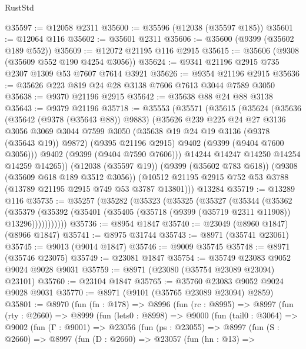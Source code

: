 \begin{lexlean}{RustStd}
\begin{coremodule}
@35597 := @12058 @2311
@35600 := @35596 (@12038 (@35597 @185))
@35601 := @12064 @116
@35602 := @35601 @2311
@35606 := @35600 (@9399 (@35602 @189 @552))
@35609 := @12072 @21195 @116 @2915
@35615 := @35606 (@9308 (@35609 @552 @190 @4254 @3056))
@35624 := @9341 @21196 @2915 @735 @2307 @1309 @53 @7607 @7614 @3921
@35626 := @9354 @21196 @2915
@35636 := @35626 @223 @819 @24 @28 @3138 @7606 @7613 @3044 @7589 @3050
@35638 := @9370 @21196 @2915
@35642 := @35638 @88 @24 @88 @3138
@35643 := @9379 @21196
@35718 := @35553
    (@35571
      (@35615
        (@35624
          (@35636
            (@35642 (@9378 (@35643 @88)) @9883)
            (@35626
              @239
              @225
              @24
              @27
              @3136
              @3056
              @3069
              @3044
              @7599
              @3050
              (@35638 @19 @24 @19 @3136 (@9378 (@35643 @19)) @9872)
              (@9395 @21196 @2915)
              @9402
              (@9399 (@9404 @7600 @3056)))
            @9402
            (@9399 (@9404 @7590 @7606)))
          @14244
          @14247
          @14250
          @14254
          @14259
          @14265))
      (@12038 (@35597 @19))
      (@9399 (@35602 @783 @618))
      (@9308 (@35609 @618 @189 @3512 @3056))
      (@10512 @21195 @2915 @752 @53 @3788 (@13789 @21195 @2915 @749 @53 @3787 @13801)))
    @13284
@35719 := @13289 @116
@35735 := @35257
    (@35282
      (@35323
        (@35325
          (@35327
            (@35344
              (@35362
                (@35379
                  (@35392 (@35401 (@35405 (@35718 (@9399 (@35719 @2311 @11908)) @13296)))))))))))
@35736 := @8954 @1847
@35740 := @23049 (@8960 @1847) (@8966 @1847)
@35741 := @8975 @31744
@35743 := @8971 (@35741 @23061)
@35745 := @9013 (@9014 @1847)
@35746 := @9009 @35745
@35748 := @8971 (@35746 @23075)
@35749 := @23081 @1847
@35754 := @35749 @23083 @9052 @9024 @9028 @9031
@35759 := @8971 (@23080 (@35754 @23089 @23094) @23101)
@35760 := @23104 @1847
@35765 := @35760 @23083 @9052 @9024 @9028 @9031
@35770 := @8971 (@9101 (@35765 @23089 @23094) @2859)
@35801 := @8970
    (fun (fn : @178) =>
    @8996
      (fun (rc : @8995) =>
      @8997
        (fun (rty : @2660) =>
        @8999
          (fun (lets0 : @8998) =>
          @9000
            (fun (tail0 : @3064) =>
            @9002
              (fun (Γ : @9001) =>
              @23056
                (fun (ps : @23055) =>
                @8997
                  (fun (S : @2660) =>
                  @8997
                    (fun (D : @2660) =>
                    @23057
                      (fun (hn : @13) =>

\end{coremodule}
\end{lexlean}
